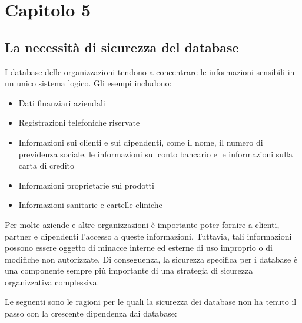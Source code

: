 \chapter{Capitolo 5}
\section{La necessità di sicurezza del database}
I database delle organizzazioni tendono a concentrare le informazioni sensibili in un unico sistema logico. Gli esempi includono:
\begin{itemize}
    \item Dati finanziari aziendali
    
    \item Registrazioni telefoniche riservate
    
    \item Informazioni sui clienti e sui dipendenti, come il nome, il numero di previdenza sociale, le informazioni sul conto bancario e le informazioni sulla carta di credito
    
    \item Informazioni proprietarie sui prodotti
    
    \item Informazioni sanitarie e cartelle cliniche 
\end{itemize}

Per molte aziende e altre organizzazioni è importante poter fornire a clienti, partner e dipendenti l'accesso a queste informazioni. Tuttavia, tali informazioni possono essere oggetto di minacce interne ed esterne di uso improprio o di modifiche non autorizzate. Di conseguenza, la sicurezza specifica per i database è una componente sempre più importante di una strategia di sicurezza organizzativa complessiva. 

\singlespacing

Le seguenti sono le ragioni per le quali la sicurezza dei database non ha tenuto il passo con la crescente dipendenza dai database:

